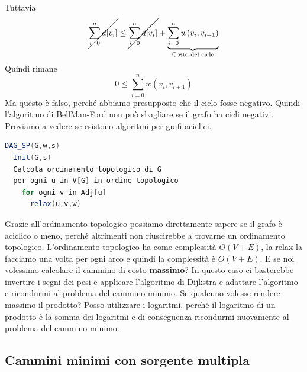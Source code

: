 \documentclass[a4paper]{article}
\begin{document}
Tuttavia 
\[  \cancel{\sum_{i=0}^n d[v_i]} \le \cancel{\sum_{i=0}^{n} d[v_i]} + \underbrace{\sum_{i=0}^{n} w(v_i, v_{i+1})}_{\text{Costo del ciclo}} \]
Quindi rimane
\[0 \le \sum_{i=0}^{n} w(v_i, v_{i+1})\]
Ma questo è falso, perché abbiamo presupposto che il ciclo fosse negativo. Quindi 
l'algoritmo di BellMan-Ford non può sbagliare se il grafo ha cicli negativi.
Proviamo a vedere se esistono algoritmi per grafi aciclici.
\begin{lstlisting}[language=Scala]
DAG_SP(G,w,s)
  Init(G,s)
  Calcola ordinamento topologico di G
  per ogni u in V[G] in ordine topologico
    for ogni v in Adj[u]
      relax(u,v,w)
\end{lstlisting}
\noindent
Grazie all'ordinamento topologico possiamo direttamente sapere se il grafo è aciclico o meno, perché altrimenti non riuscirebbe a trovarne
un ordinamento topologico. L'ordinamento topologico ha come complessità $O(V+E)$, la relax la facciamo una volta per ogni arco e quindi la complessità è $O(V+E)$.
E se noi volessimo calcolare il cammino di costo \textbf{massimo}? In questo caso ci basterebbe invertire i segni dei pesi e applicare l'algoritmo di Dijkstra e adattare
l'algoritmo e ricondurmi al problema del cammino minimo. 
Se qualcuno volesse rendere massimo il prodotto? Posso utilizzare i logaritmi, perché il logaritmo di un prodotto è la somma dei logaritmi e di conseguenza 
ricondurmi nuovamente al problema del cammino minimo.

\subsection{Cammini minimi con sorgente multipla}
\end{document}
